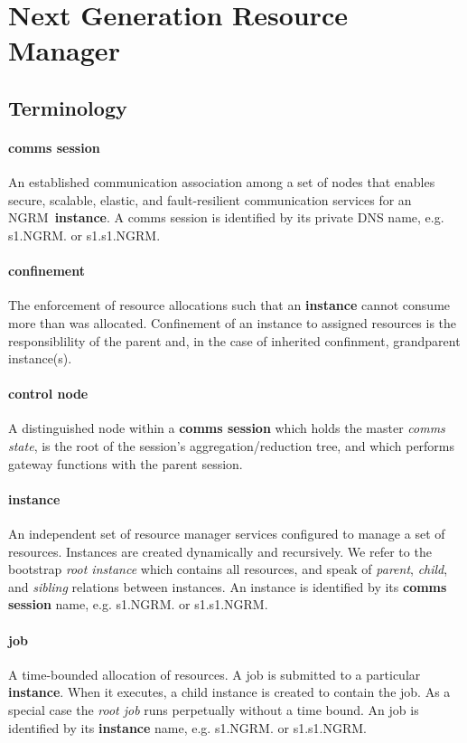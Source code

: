 \documentclass{article}
\newcommand{\ngrm}{NGRM}
\begin{document}
\section{Next Generation Resource Manager}
\subsection{Terminology}

\paragraph{comms session}
An established communication association among a set of nodes that
enables secure, scalable, elastic, and fault-resilient communication
services for an \ngrm\ {\bf instance}.
A comms session is identified by its private DNS name, e.g. s1.\ngrm.
or s1.s1.\ngrm.

\paragraph{confinement}
The enforcement of resource allocations such that an {\bf instance} cannot
consume more than was allocated.  Confinement of an instance to assigned
resources is the responsiblility of the parent and, in the case of inherited
confinment, grandparent instance(s).

\paragraph{control node}
A distinguished node within a {\bf comms session} which holds the master
{\em comms state}, is the root of the session's aggregation/reduction tree,
and which performs gateway functions with the parent session.

\paragraph{instance}
An independent set of resource manager services configured to manage
a set of resources.
Instances are created dynamically and recursively.
We refer to the bootstrap {\em root instance} which contains all resources,
and speak of {\em parent}, {\em child}, and {\em sibling} relations between
instances.
An instance is identified by its {\bf comms session} name,
e.g. s1.\ngrm.  or s1.s1.\ngrm.

\paragraph{job}
A time-bounded allocation of resources.  A job is submitted to a
particular {\bf instance}.  When it executes, a child instance is
created to contain the job.  As a special case the {\em root job} 
runs perpetually without a time bound.
An job is identified by its {\bf instance} name,
e.g. s1.\ngrm.  or s1.s1.\ngrm.
\end{document}
